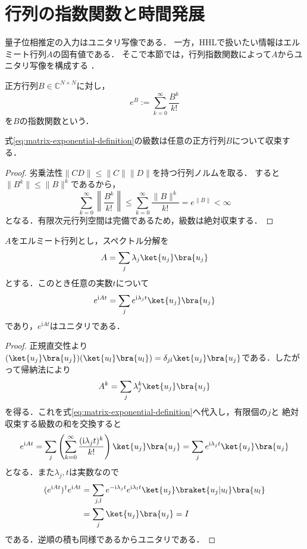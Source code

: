 \section{行列の指数関数と時間発展}
\label{sec:matrix-exponential}

量子位相推定の入力はユニタリ写像である．
一方，HHLで扱いたい情報はエルミート行列$A$の固有値である．
そこで本節では，行列指数関数によって$A$からユニタリ写像を構成する
\cite{shimada2020}．

\begin{defi}[行列指数関数]
正方行列$B\in\mathbb C^{N\times N}$に対し，
\begin{equation}
 e^B:=\sum_{k=0}^{\infty}\frac{B^k}{k!}
 \label{eq:matrix-exponential-definition}
\end{equation}
を$B$の指数関数という．
\end{defi}

\begin{prop}
式\eqref{eq:matrix-exponential-definition}の級数は任意の正方行列$B$について収束する．
\end{prop}
\begin{proof}
劣乗法性$\lVert CD\rVert\leq\lVert C\rVert\lVert D\rVert$を持つ行列ノルムを取る．
すると$\lVert B^k\rVert\leq\lVert B\rVert^k$であるから，
\[
 \sum_{k=0}^{\infty}\left\lVert\frac{B^k}{k!}\right\rVert
 \leq\sum_{k=0}^{\infty}\frac{\lVert B\rVert^k}{k!}
 =e^{\lVert B\rVert}<\infty
\]
となる．有限次元行列空間は完備であるため，級数は絶対収束する．
\end{proof}

\begin{theo}
$A$をエルミート行列とし，スペクトル分解を
\begin{equation}
 A=\sum_j\lambda_j\ket{u_j}\bra{u_j}
 \label{eq:hermitian-spectral-decomposition}
\end{equation}
とする．このとき任意の実数$t$について
\begin{equation}
 e^{\mathrm{i}At}
 =\sum_j e^{\mathrm{i}\lambda_jt}\ket{u_j}\bra{u_j}
 \label{eq:matrix-exponential-spectral}
\end{equation}
であり，$e^{\mathrm{i}At}$はユニタリである．
\end{theo}
\begin{proof}
正規直交性より
$(\ket{u_j}\bra{u_j})(\ket{u_l}\bra{u_l})
=\delta_{jl}\ket{u_j}\bra{u_j}$である．したがって帰納法により
\[
 A^k=\sum_j\lambda_j^k\ket{u_j}\bra{u_j}
\]
を得る．これを式\eqref{eq:matrix-exponential-definition}へ代入し，有限個の$j$と
絶対収束する級数の和を交換すると
\[
 e^{\mathrm{i}At}
 =\sum_j\left(\sum_{k=0}^{\infty}
   \frac{(\mathrm{i}\lambda_jt)^k}{k!}\right)
   \ket{u_j}\bra{u_j}
 =\sum_je^{\mathrm{i}\lambda_jt}\ket{u_j}\bra{u_j}
\]
となる．また$\lambda_j,t$は実数なので
\begin{align*}
 (e^{\mathrm{i}At})^\dagger e^{\mathrm{i}At}
 &=\sum_{j,l}e^{-\mathrm{i}\lambda_jt}e^{\mathrm{i}\lambda_lt}
   \ket{u_j}\braket{u_j|u_l}\bra{u_l}\\
 &=\sum_j\ket{u_j}\bra{u_j}=I
\end{align*}
である．逆順の積も同様であるからユニタリである．
\end{proof}

